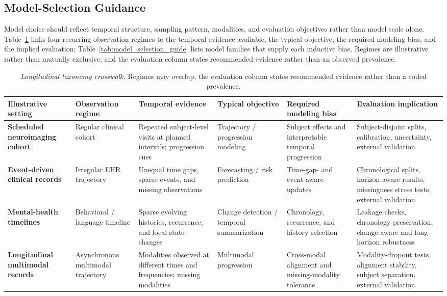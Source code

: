 \documentclass[11pt]{article}
\theoremstyle{plain}
\theoremstyle{definition}
\theoremstyle{remark}
\begin{document}
\subsection{Model-Selection Guidance}
\label{sec:appendix_model_selection}
Model choice should reflect temporal structure, sampling pattern, modalities, and evaluation objectives rather than model scale alone. Table~\ref{tab:longitudinal_taxonomy_logic} links four recurring observation regimes to the temporal evidence available, the typical objective, the required modeling bias, and the implied evaluation; Table~\ref{tab:model_selection_guide} lists model families that supply each inductive bias. Regimes are illustrative rather than mutually exclusive, and the evaluation column states recommended evidence rather than an observed prevalence.

\begin{table}[t]
\centering
\small
\setlength{\tabcolsep}{3.2pt}
\renewcommand{\arraystretch}{1.03}
\begin{tabularx}{\textwidth}{@{}>{\raggedright\arraybackslash\bfseries}p{2.35cm}>{\raggedright\arraybackslash}p{2.45cm}>{\raggedright\arraybackslash}p{2.55cm}>{\raggedright\arraybackslash}p{2.35cm}>{\raggedright\arraybackslash}p{2.75cm}>{\raggedright\arraybackslash}X@{}}
\toprule
\rowcolor{gray!18}
\textbf{Illustrative setting} & \textbf{Observation regime} & \textbf{Temporal evidence} & \textbf{Typical objective} & \textbf{Required modeling bias} & \textbf{Evaluation implication} \\
\midrule
Scheduled neuroimaging cohort & Regular clinical cohort & Repeated subject-level visits at planned intervals; progression cues & Trajectory / progression modeling & Subject effects and interpretable temporal progression & Subject-disjoint splits, calibration, uncertainty, external validation \\
Event-driven clinical records & Irregular EHR trajectory & Unequal time gaps, sparse events, and missing observations & Forecasting / risk prediction & Time-gap- and event-aware updates & Chronological splits, horizon-aware results, missingness stress tests, external validation \\
Mental-health timelines & Behavioral / language timeline & Sparse evolving histories, recurrence, and local state changes & Change detection / temporal summarization & Chronology, recurrence, and history selection & Leakage checks, chronology preservation, change-aware and long-horizon robustness \\
Longitudinal multimodal records & Asynchronous multimodal trajectory & Modalities observed at different times and frequencies; missing modalities & Multimodal progression & Cross-modal alignment and missing-modality tolerance & Modality-dropout tests, alignment stability, subject separation, external validation \\
\bottomrule
\end{tabularx}
\caption{\textit{Longitudinal taxonomy crosswalk.} Regimes may overlap; the evaluation column states recommended evidence rather than a coded prevalence.}
\label{tab:longitudinal_taxonomy_logic}
\end{table}
\end{document}
